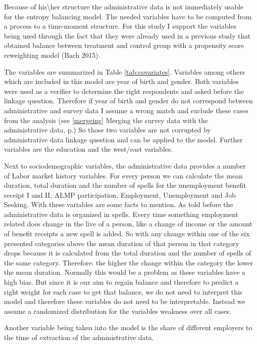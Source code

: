 Because of his\textbackslash her structure the administrative data is not immediately usable for the entropy balancing model. The needed variables have to be computed from a process to a time-moment structure. For this study I support the variables being used through the fact that they were already used in a previous study that obtained balance between treatment and control group with a propensity score reweighting model (Bach 2015).

The variables are summarized in Table \ref{tab:covariates}. Variables among others which are included in this model are year of birth and gender. Both variables were used as a verifier to determine the right respondents and asked before the linkage question. Therefore if year of birth and gender do not correspond between administrative and survey data I assume a wrong match and exclude these cases from the analysis (see \ref{mergeing} Merging the survey data with the administrative data, p.\pageref{mergeing}) So those two variables are not corrupted by administrative data linkage question and can be applied to the model. Further variables are the education and the west/east variables.



Next to sociodemographic variables, the administrative data provides a number of Labor market history variables. For every person we can calculate the mean duration, total duration and the number of spells for the unemployment benefit receipt I and II, ALMP participation, Employment, Unemployment and Job Seeking. With these variables are some facts to mention. As told before the administrative data is organized in spells. Every time something employment related does change in the live of a person, like a change of income or the amount of benefit receipts a new spell is added. So with any change within one of the six presented categories above the mean duration of that person in that category drops because it is calculated from the total duration and the number of spells of the same category. Therefore: the higher the change within the category the lower the mean duration. Normally this would be a problem as these variables have a high bias. But since it is our aim to regain balance and therefore to predict a right weight for each case to get that balance, we do not need to interpret this model and therefore these variables do not need to be interpretable. Instead we assume a randomized distribution for the variables weakness over all cases. 

Another variable being taken into the model is the share of different employers to the time of extraction of the administrative data.

